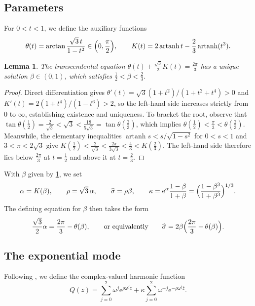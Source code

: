 \documentclass[11pt,reqno]{amsart}
\numberwithin{equation}{section}
\newtheorem{lemma}[lemma]{Lemma}
\theoremstyle{remark}
\newcommand{\ee}{\mathrm e}
\newcommand{\om}{\omega}
\DeclareMathOperator{\artanh}{artanh}
\begin{document}
\subsection{Parameters}
For $0<t<1$, we define the auxiliary functions
\begin{equation}\label{eq:theta-K}
 \theta(t)=\arctan\frac{\sqrt3\,t}{1-t^2}\in\Bigl(0,\frac\pi2\Bigr),
 \qquad
 K(t)=2\artanh t-\frac23\artanh(t^3).
\end{equation}

\begin{lemma}\label{lem:root}
The transcendental equation $\theta(t)+\frac{\sqrt3}{2}K(t)=\frac{2\pi}{3}$ has a
unique solution $\beta\in(0,1)$, which satisfies $\frac12<\beta<\frac23$.
\end{lemma}
\begin{proof}
Direct differentiation gives $\theta'(t)=\sqrt3(1+t^2)/(1+t^2+t^4)>0$ and
$K'(t)=2(1+t^4)/(1-t^6)>2$, so the left-hand side increases strictly from
$0$ to $\infty$, establishing existence and uniqueness. To bracket the root,
observe that $\tan\theta(\frac12)=\frac2{\sqrt3}<\sqrt3 <\frac{18}{5\sqrt3}=\tan\theta(\frac23)$, which implies
$\theta(\frac12)<\frac\pi3<\theta(\frac23)$. Meanwhile, the elementary inequalities
$\artanh s<s/\sqrt{1-s^2}$ for $0<s<1$ and $3<\pi<2\sqrt3$ give
$K(\frac12)<\frac2{\sqrt3}<\frac{2\pi}{3\sqrt3}<\frac43<K(\frac23)$. The
left-hand side therefore lies below $\frac{2\pi}{3}$ at $t=\frac12$ and above it
at $t=\frac23$.
\end{proof}

With $\beta$ given by \cref{lem:root}, we set
\begin{equation}\label{eq:parameters}
 \alpha=K(\beta),\qquad \rho=\sqrt3\,\alpha,\qquad
 \widehat\sigma=\rho\beta,\qquad
 \kappa=\ee^{\alpha}\frac{1-\beta}{1+\beta}
       =\Bigl(\frac{1-\beta^3}{1+\beta^3}\Bigr)^{1/3}.
\end{equation}
The defining equation for $\beta$ then takes the form
\begin{equation}\label{eq:alpha}
 \frac{\sqrt3}{2}\alpha=\frac{2\pi}{3}-\theta(\beta),
 \qquad\text{or equivalently}\qquad
 \widehat\sigma=2\beta\Bigl(\frac{2\pi}3-\theta(\beta)\Bigr).
\end{equation}

\subsection{The exponential mode}
Following \cite{McC}, we define the complex-valued harmonic function
\begin{equation}\label{eq:Q}
 Q(z)=\sum_{j=0}^2\om^j\ee^{\rho\om^jz}
       +\kappa\sum_{j=0}^2\om^{-j}\ee^{-\rho\om^j\overline z}.
\end{equation}
\end{document}
